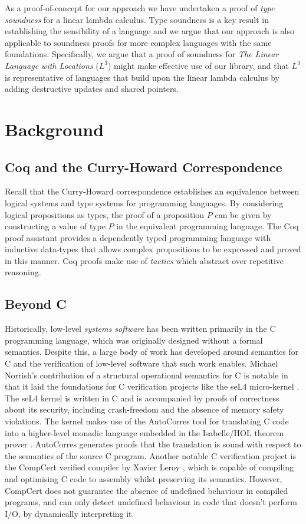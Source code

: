 \documentclass[]{unswthesis}
\let\i\textit
\begin{document}
As a proof-of-concept for our approach we have undertaken a proof of \i{type soundness} for a linear lambda calculus. Type soundness is a key result in establishing the sensibility of a language and we argue that our approach is also applicable to soundness proofs for more complex languages with the same foundations. Specifically, we argue that a proof of soundness for \i{The Linear Language with Locations} ($L^3$) might make effective use of our library, and that $L^3$ is representative of languages that build upon the linear lambda calculus by adding destructive updates and shared pointers.

\chapter{Background}
\label{ch:background}

\section{Coq and the Curry-Howard Correspondence}
\label{sec:curry_howard}

Recall that the Curry-Howard correspondence establishes an equivalence between logical systems and type systems for programming languages. By considering logical propositions as types, the proof of a proposition $P$ can be given by constructing a value of type $P$ in the equivalent programming language. The Coq proof assistant provides a dependently typed programming language with inductive data-types that allows complex propositions to be expressed and proved in this manner. Coq proofs make use of \i{tactics} which abstract over repetitive reasoning.

\section{Beyond C}

Historically, low-level \textit{systems software} has been written primarily in the C programming language, which was originally designed without a formal semantics. Despite this, a large body of work has developed around semantics for C and the verification of low-level software that such work enables. Michael Norrish's contribution of a structural operational semantics for C \cite{norrish98} is notable in that it laid the foundations for C verification projects like the seL4 micro-kernel \cite{klein14}. The seL4 kernel is written in C and is accompanied by proofs of correctness about its security, including crash-freedom and the absence of memory safety violations. The kernel makes use of the AutoCorres tool for translating C code into a higher-level monadic language embedded in the Isabelle/HOL theorem prover \cite{greenaway14}. AutoCorres generates proofs that the translation is sound with respect to the semantics of the source C program.
Another notable C verification project is the CompCert verified compiler by Xavier Leroy \cite{leroy09}, which is capable of compiling and optimising C code to assembly whilst preserving its semantics. However, CompCert does not guarantee the absence of undefined behaviour in compiled programs, and can only detect undefined behaviour in code that doesn't perform I/O, by dynamically interpreting it.
\end{document}
